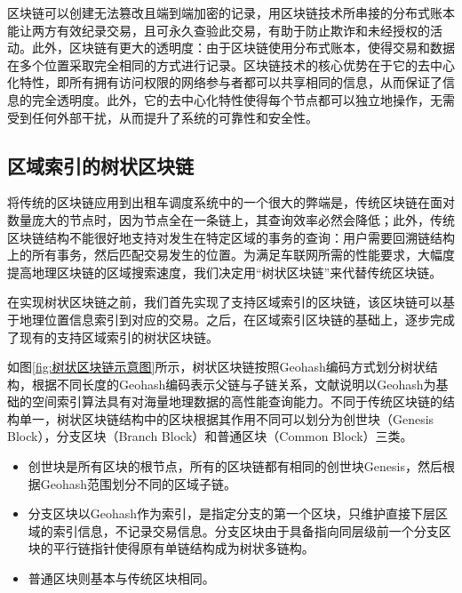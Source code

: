区块链可以创建无法篡改且端到端加密的记录，用区块链技术所串接的分布式账本能让两方有效纪录交易，且可永久查验此交易，有助于防止欺诈和未经授权的活动。此外，区块链有更大的透明度：由于区块链使用分布式账本，使得交易和数据在多个位置采取完全相同的方式进行记录。区块链技术的核心优势在于它的去中心化特性，即所有拥有访问权限的网络参与者都可以共享相同的信息，从而保证了信息的完全透明度。此外，它的去中心化特性使得每个节点都可以独立地操作，无需受到任何外部干扰，从而提升了系统的可靠性和安全性\cite{sun2018}。

\subsection{区域索引的树状区块链}

将传统的区块链应用到出租车调度系统中的一个很大的弊端是，传统区块链在面对数量庞大的节点时，因为节点全在一条链上，其查询效率必然会降低；此外，传统区块链结构不能很好地支持对发生在特定区域的事务的查询：用户需要回溯链结构上的所有事务，然后匹配交易发生的位置\cite{alladi2022,ibrahim2022}。为满足车联网所需的性能要求，大幅度提高地理区块链的区域搜索速度，我们决定用“树状区块链”来代替传统区块链。

在实现树状区块链之前，我们首先实现了支持区域索引的区块链，该区块链可以基于地理位置信息索引到对应的交易\cite{zhou2022}。之后，在区域索引区块链的基础上，逐步完成了现有的支持区域索引的树状区块链。

如图\ref{fig:树状区块链示意图}所示，树状区块链按照Geohash编码方式划分树状结构，根据不同长度的Geohash编码表示父链与子链关系，文献\cite{liu2014}说明以Geohash为基础的空间索引算法具有对海量地理数据的高性能查询能力。不同于传统区块链的结构单一，树状区块链结构中的区块根据其作用不同可以划分为创世块（Genesis Block），分支区块（Branch Block）和普通区块（Common Block）三类。

\begin{itemize}
    \item 创世块是所有区块的根节点，所有的区块链都有相同的创世块Genesis，然后根据Geohash范围划分不同的区域子链。
    \item 分支区块以Geohash作为索引，是指定分支的第一个区块，只维护直接下层区域的索引信息，不记录交易信息。分支区块由于具备指向同层级前一个分支区块的平行链指针使得原有单链结构成为树状多链构。
    \item 普通区块则基本与传统区块相同。
\end{itemize}


